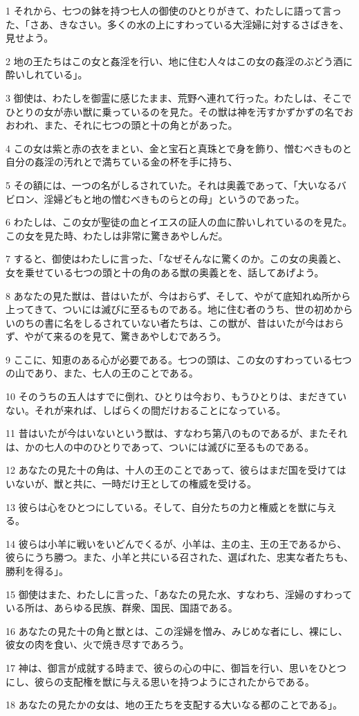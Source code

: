 \par 1 それから、七つの鉢を持つ七人の御使のひとりがきて、わたしに語って言った、「さあ、きなさい。多くの水の上にすわっている大淫婦に対するさばきを、見せよう。
\par 2 地の王たちはこの女と姦淫を行い、地に住む人々はこの女の姦淫のぶどう酒に酔いしれている」。
\par 3 御使は、わたしを御霊に感じたまま、荒野へ連れて行った。わたしは、そこでひとりの女が赤い獣に乗っているのを見た。その獣は神を汚すかずかずの名でおおわれ、また、それに七つの頭と十の角とがあった。
\par 4 この女は紫と赤の衣をまとい、金と宝石と真珠とで身を飾り、憎むべきものと自分の姦淫の汚れとで満ちている金の杯を手に持ち、
\par 5 その額には、一つの名がしるされていた。それは奥義であって、「大いなるバビロン、淫婦どもと地の憎むべきものらとの母」というのであった。
\par 6 わたしは、この女が聖徒の血とイエスの証人の血に酔いしれているのを見た。この女を見た時、わたしは非常に驚きあやしんだ。
\par 7 すると、御使はわたしに言った、「なぜそんなに驚くのか。この女の奥義と、女を乗せている七つの頭と十の角のある獣の奥義とを、話してあげよう。
\par 8 あなたの見た獣は、昔はいたが、今はおらず、そして、やがて底知れぬ所から上ってきて、ついには滅びに至るものである。地に住む者のうち、世の初めからいのちの書に名をしるされていない者たちは、この獣が、昔はいたが今はおらず、やがて来るのを見て、驚きあやしむであろう。
\par 9 ここに、知恵のある心が必要である。七つの頭は、この女のすわっている七つの山であり、また、七人の王のことである。
\par 10 そのうちの五人はすでに倒れ、ひとりは今おり、もうひとりは、まだきていない。それが来れば、しばらくの間だけおることになっている。
\par 11 昔はいたが今はいないという獣は、すなわち第八のものであるが、またそれは、かの七人の中のひとりであって、ついには滅びに至るものである。
\par 12 あなたの見た十の角は、十人の王のことであって、彼らはまだ国を受けてはいないが、獣と共に、一時だけ王としての権威を受ける。
\par 13 彼らは心をひとつにしている。そして、自分たちの力と権威とを獣に与える。
\par 14 彼らは小羊に戦いをいどんでくるが、小羊は、主の主、王の王であるから、彼らにうち勝つ。また、小羊と共にいる召された、選ばれた、忠実な者たちも、勝利を得る」。
\par 15 御使はまた、わたしに言った、「あなたの見た水、すなわち、淫婦のすわっている所は、あらゆる民族、群衆、国民、国語である。
\par 16 あなたの見た十の角と獣とは、この淫婦を憎み、みじめな者にし、裸にし、彼女の肉を食い、火で焼き尽すであろう。
\par 17 神は、御言が成就する時まで、彼らの心の中に、御旨を行い、思いをひとつにし、彼らの支配権を獣に与える思いを持つようにされたからである。
\par 18 あなたの見たかの女は、地の王たちを支配する大いなる都のことである」。

